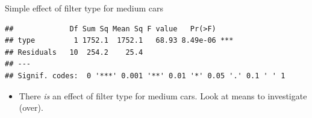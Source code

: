 \documentclass[
  ignorenonframetext,
]{beamer}
\newenvironment{Shaded}{\begin{snugshade}}{\end{snugshade}}
\newcommand{\DataTypeTok}[1]{\textcolor[rgb]{0.13,0.29,0.53}{#1}}
\newcommand{\KeywordTok}[1]{\textcolor[rgb]{0.13,0.29,0.53}{\textbf{#1}}}
\newcommand{\NormalTok}[1]{#1}
\newcommand{\OperatorTok}[1]{\textcolor[rgb]{0.81,0.36,0.00}{\textbf{#1}}}
\newcommand{\StringTok}[1]{\textcolor[rgb]{0.31,0.60,0.02}{#1}}
\providecommand{\tightlist}{%
  \setlength{\itemsep}{0pt}\setlength{\parskip}{0pt}}
\begin{document}
\begin{frame}[fragile]{Simple effect of filter type for medium cars}
\protect\hypertarget{simple-effect-of-filter-type-for-medium-cars}{}

\small

\begin{Shaded}
\end{Shaded}

\begin{verbatim}
##             Df Sum Sq Mean Sq F value   Pr(>F)    
## type         1 1752.1  1752.1   68.93 8.49e-06 ***
## Residuals   10  254.2    25.4                     
## ---
## Signif. codes:  0 '***' 0.001 '**' 0.01 '*' 0.05 '.' 0.1 ' ' 1
\end{verbatim}

\normalsize

\begin{itemize}
\tightlist
\item
  There \emph{is} an effect of filter type for medium cars. Look at
  means to investigate (over).
\end{itemize}

\end{frame}
\end{document}
